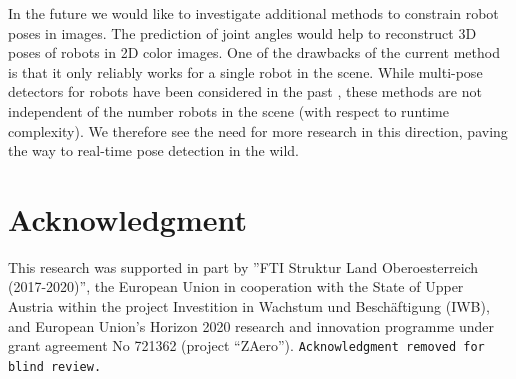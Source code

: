 \documentclass[conference]{IEEEtran}
\begin{document}
In the future we would like to investigate additional methods to constrain robot poses in images. The prediction of joint angles would help to reconstruct 3D poses of robots in 2D color images. One of the drawbacks of the current method is that it only reliably works for a single robot in the scene. While multi-pose detectors for robots have been considered in the past \cite{cheind2019disp}, these methods are not independent of the number robots in the scene (with respect to runtime complexity). We therefore see the need for more research in this direction, paving the way to real-time pose detection in the wild.

\section*{Acknowledgment}
\iffinalcopy
This research was supported in part by ”FTI Struktur Land Oberoesterreich (2017-2020)”, the European Union in cooperation with the State of Upper Austria within the project Investition in Wachstum und Beschäftigung (IWB), and European Union’s Horizon 2020 research and innovation programme under grant agreement No 721362 (project “ZAero”).
\else
\texttt{Acknowledgment removed for blind review.}
\fi

\small


\end{document}
